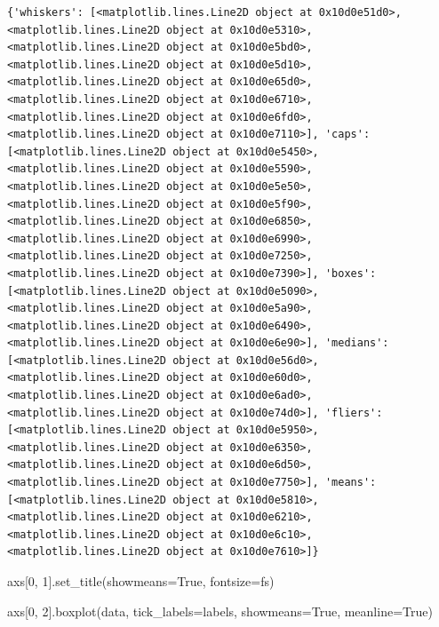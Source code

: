 \documentclass[
  letterpaper,
  DIV=11,
  numbers=noendperiod]{scrreprt}
\newenvironment{Shaded}{\begin{snugshade}}{\end{snugshade}}
\newcommand{\DecValTok}[1]{\textcolor[rgb]{0.68,0.00,0.00}{#1}}
\newcommand{\NormalTok}[1]{\textcolor[rgb]{0.00,0.23,0.31}{#1}}
\newcommand{\OperatorTok}[1]{\textcolor[rgb]{0.37,0.37,0.37}{#1}}
\newcommand{\StringTok}[1]{\textcolor[rgb]{0.13,0.47,0.30}{#1}}
\newcommand{\VariableTok}[1]{\textcolor[rgb]{0.07,0.07,0.07}{#1}}
\begin{document}
\begin{verbatim}
{'whiskers': [<matplotlib.lines.Line2D object at 0x10d0e51d0>, <matplotlib.lines.Line2D object at 0x10d0e5310>, <matplotlib.lines.Line2D object at 0x10d0e5bd0>, <matplotlib.lines.Line2D object at 0x10d0e5d10>, <matplotlib.lines.Line2D object at 0x10d0e65d0>, <matplotlib.lines.Line2D object at 0x10d0e6710>, <matplotlib.lines.Line2D object at 0x10d0e6fd0>, <matplotlib.lines.Line2D object at 0x10d0e7110>], 'caps': [<matplotlib.lines.Line2D object at 0x10d0e5450>, <matplotlib.lines.Line2D object at 0x10d0e5590>, <matplotlib.lines.Line2D object at 0x10d0e5e50>, <matplotlib.lines.Line2D object at 0x10d0e5f90>, <matplotlib.lines.Line2D object at 0x10d0e6850>, <matplotlib.lines.Line2D object at 0x10d0e6990>, <matplotlib.lines.Line2D object at 0x10d0e7250>, <matplotlib.lines.Line2D object at 0x10d0e7390>], 'boxes': [<matplotlib.lines.Line2D object at 0x10d0e5090>, <matplotlib.lines.Line2D object at 0x10d0e5a90>, <matplotlib.lines.Line2D object at 0x10d0e6490>, <matplotlib.lines.Line2D object at 0x10d0e6e90>], 'medians': [<matplotlib.lines.Line2D object at 0x10d0e56d0>, <matplotlib.lines.Line2D object at 0x10d0e60d0>, <matplotlib.lines.Line2D object at 0x10d0e6ad0>, <matplotlib.lines.Line2D object at 0x10d0e74d0>], 'fliers': [<matplotlib.lines.Line2D object at 0x10d0e5950>, <matplotlib.lines.Line2D object at 0x10d0e6350>, <matplotlib.lines.Line2D object at 0x10d0e6d50>, <matplotlib.lines.Line2D object at 0x10d0e7750>], 'means': [<matplotlib.lines.Line2D object at 0x10d0e5810>, <matplotlib.lines.Line2D object at 0x10d0e6210>, <matplotlib.lines.Line2D object at 0x10d0e6c10>, <matplotlib.lines.Line2D object at 0x10d0e7610>]}
\end{verbatim}

\begin{Shaded}
\begin{Highlighting}[]
\NormalTok{axs[}\DecValTok{0}\NormalTok{, }\DecValTok{1}\NormalTok{].set\_title(}\StringTok{\textquotesingle{}showmeans=True\textquotesingle{}}\NormalTok{, fontsize}\OperatorTok{=}\NormalTok{fs)}

\NormalTok{axs[}\DecValTok{0}\NormalTok{, }\DecValTok{2}\NormalTok{].boxplot(data, tick\_labels}\OperatorTok{=}\NormalTok{labels, showmeans}\OperatorTok{=}\VariableTok{True}\NormalTok{, meanline}\OperatorTok{=}\VariableTok{True}\NormalTok{)}
\end{Highlighting}
\end{Shaded}
\end{document}
